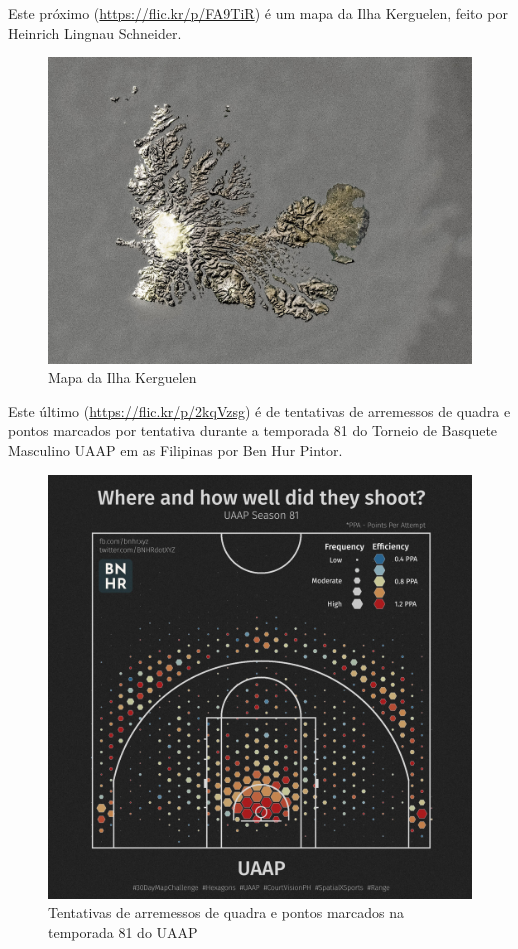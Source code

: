 \documentclass[
  portuguese,
]{krantz}
\begin{document}
Este próximo (\url{https://flic.kr/p/FA9TiR}) é um mapa da Ilha Kerguelen, feito por Heinrich Lingnau Schneider.

\begin{figure}
\centering
\includegraphics{media/modulo1/sample-3.jpg}
\caption{Mapa da Ilha Kerguelen}
\end{figure}

Este último (\href{https://flic.kr/p/v2kqVzsg}{https://flic.kr/p/2kqVzsg}) é de tentativas de arremessos de quadra e pontos marcados por tentativa durante a temporada 81 do Torneio de Basquete Masculino UAAP em as Filipinas por Ben Hur Pintor.

\begin{figure}
\centering
\includegraphics{media/modulo1/sample-4.jpg}
\caption{Tentativas de arremessos de quadra e pontos marcados na temporada 81 do UAAP}
\end{figure}
\end{document}
